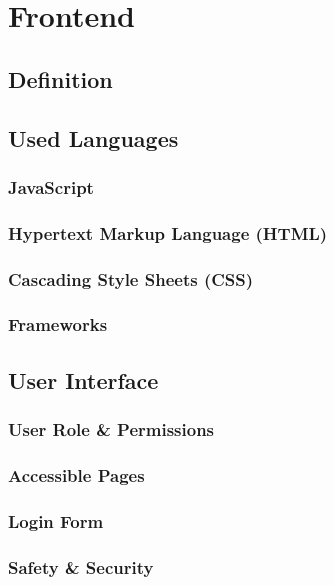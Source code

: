 \chapter{Frontend}

\section{Definition}

\section{Used Languages}

    \subsection{JavaScript}

    \subsection{Hypertext Markup Language (HTML)}

    \subsection{Cascading Style Sheets (CSS)}

    \subsection{Frameworks}

\section{User Interface}

    \subsection{User Role \& Permissions}
    
    \subsection{Accessible Pages}

    \subsection{Login Form}

    \subsection{Safety \& Security}